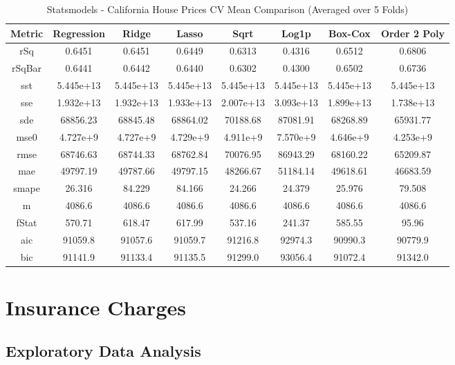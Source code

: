 \documentclass{article}
\begin{document}
\begin{table}[H]
\centering
\caption{Statsmodels - California House Prices CV Mean Comparison (Averaged over 5 Folds)}
\label{tab:Statsmodels - California House Prices CV Mean Comparison}
\begin{tabular}{|c|c|c|c|c|c|c|c|}\hline
Metric & Regression & Ridge & Lasso & Sqrt & Log1p & Box-Cox & Order 2 Poly \\\hline \hline
rSq & 0.6451 & 0.6451 & 0.6449 & 0.6313 & 0.4316 & 0.6512 & 0.6806 \\\hline
rSqBar & 0.6441 & 0.6442 & 0.6440 & 0.6302 & 0.4300 & 0.6502 & 0.6736 \\\hline
sst & 5.445e+13 & 5.445e+13 & 5.445e+13 & 5.445e+13 & 5.445e+13 & 5.445e+13 & 5.445e+13 \\\hline
sse & 1.932e+13 & 1.932e+13 & 1.933e+13 & 2.007e+13 & 3.093e+13 & 1.899e+13 & 1.738e+13 \\\hline
sde & 68856.23 & 68845.48 & 68864.02 & 70188.68 & 87081.91 & 68268.89 & 65931.77 \\\hline
mse0 & 4.727e+9 & 4.727e+9 & 4.729e+9 & 4.911e+9 & 7.570e+9 & 4.646e+9 & 4.253e+9 \\\hline
rmse & 68746.63 & 68744.33 & 68762.84 & 70076.95 & 86943.29 & 68160.22 & 65209.87 \\\hline
mae & 49797.19 & 49787.66 & 49797.15 & 48266.67 & 51184.14 & 49618.61 & 46683.59 \\\hline
smape & 26.316 & 84.229 & 84.166 & 24.266 & 24.379 & 25.976 & 79.508 \\\hline
m & 4086.6 & 4086.6 & 4086.6 & 4086.6 & 4086.6 & 4086.6 & 4086.6 \\\hline
fStat & 570.71 & 618.47 & 617.99 & 537.16 & 241.37 & 585.55 & 95.96 \\\hline
aic & 91059.8 & 91057.6 & 91059.7 & 91216.8 & 92974.3 & 90990.3 & 90779.9 \\\hline
bic & 91141.9 & 91133.4 & 91135.5 & 91299.0 & 93056.4 & 91072.4 & 91342.0 \\\hline
\end{tabular}
\end{table}

\section{Insurance Charges}\label{Insurance Charges}

\subsection{Exploratory Data Analysis}
\end{document}
